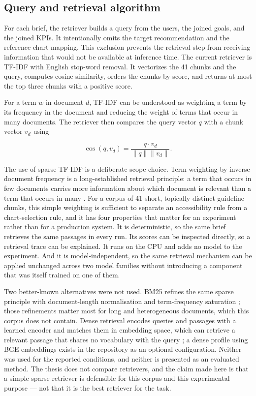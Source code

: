 \subsection{Query and retrieval algorithm}

For each brief, the retriever builds a query from the users, the joined goals, and the joined KPIs. It intentionally omits the target recommendation and the reference chart mapping. This exclusion prevents the retrieval step from receiving information that would not be available at inference time. The current retriever is TF-IDF with English stop-word removal. It vectorizes the 41 chunks and the query, computes cosine similarity, orders the chunks by score, and returns at most the top three chunks with a positive score.

For a term \(w\) in document \(d\), TF-IDF can be understood as weighting a term by its frequency in the document and reducing the weight of terms that occur in many documents. The retriever then compares the query vector \(q\) with a chunk vector \(v_d\) using

\[
\operatorname{cos}(q,v_d)
=\frac{q\cdot v_d}{\lVert q\rVert\lVert v_d\rVert}.
\]

The use of sparse TF-IDF is a deliberate scope choice. Term weighting by inverse document frequency is a long-established retrieval principle: a term that occurs in few documents carries more information about which document is relevant than a term that occurs in many \cite{sparckjones1972idf}. For a corpus of 41 short, topically distinct guideline chunks, this simple weighting is sufficient to separate an accessibility rule from a chart-selection rule, and it has four properties that matter for an experiment rather than for a production system. It is deterministic, so the same brief retrieves the same passages in every run. Its scores can be inspected directly, so a retrieval trace can be explained. It runs on the CPU and adds no model to the experiment. And it is model-independent, so the same retrieval mechanism can be applied unchanged across two model families without introducing a component that was itself trained on one of them.

Two better-known alternatives were not used. BM25 refines the same sparse principle with document-length normalisation and term-frequency saturation \cite{robertson2009bm25}; those refinements matter most for long and heterogeneous documents, which this corpus does not contain. Dense retrieval encodes queries and passages with a learned encoder and matches them in embedding space, which can retrieve a relevant passage that shares no vocabulary with the query \cite{karpukhin2020dpr}; a dense profile using BGE embeddings exists in the repository as an optional configuration. Neither was used for the reported conditions, and neither is presented as an evaluated method. The thesis does not compare retrievers, and the claim made here is that a simple sparse retriever is defensible for this corpus and this experimental purpose --- not that it is the best retriever for the task.

